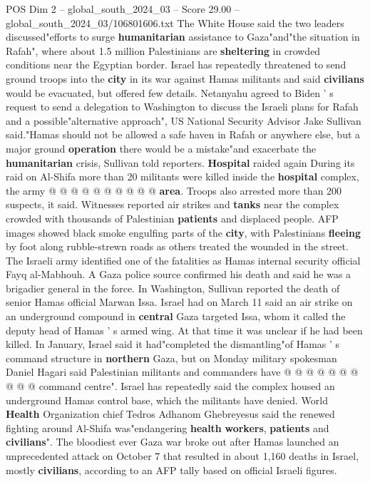 \begin{textsample}{POS Dim 2 – global\_south\_2024\_03 – Score 29.00 – global\_south\_2024\_03/106801606.txt}
The White House said the two leaders discussed"efforts to surge \textbf{humanitarian} assistance to Gaza"and"the situation in Rafah", where about 1.5 million Palestinians are \textbf{sheltering} in crowded conditions near the Egyptian border.
Israel has repeatedly threatened to send ground troops into the \textbf{city} in its war against Hamas militants and said \textbf{civilians} would be evacuated, but offered few details.
Netanyahu agreed to Biden ' s request to send a delegation to Washington to discuss the Israeli plans for Rafah and a possible"alternative approach", US National Security Advisor Jake Sullivan said."Hamas should not be allowed a safe haven in Rafah or anywhere else, but a major ground \textbf{operation} there would be a mistake"and exacerbate the \textbf{humanitarian} crisis, Sullivan told reporters. \textbf{Hospital} raided again During its raid on Al-Shifa more than 20 militants were killed inside the \textbf{hospital} complex, the army @ @ @ @ @ @ @ @ @ @ \textbf{area}.
Troops also arrested more than 200 suspects, it said.
Witnesses reported air strikes and \textbf{tanks} near the complex crowded with thousands of Palestinian \textbf{patients} and displaced people.
AFP images showed black smoke engulfing parts of the \textbf{city}, with Palestinians \textbf{fleeing} by foot along rubble-strewn roads as others treated the wounded in the street.
The Israeli army identified one of the fatalities as Hamas internal security official Fayq al-Mabhouh.
A Gaza police source confirmed his death and said he was a brigadier general in the force.
In Washington, Sullivan reported the death of senior Hamas official Marwan Issa.
Israel had on March 11 said an air strike on an underground compound in \textbf{central} Gaza targeted Issa, whom it called the deputy head of Hamas ' s armed wing.
At that time it was unclear if he had been killed.
In January, Israel said it had"completed the dismantling"of Hamas ' s command structure in \textbf{northern} Gaza, but on Monday military spokesman Daniel Hagari said Palestinian militants and commanders have @ @ @ @ @ @ @ @ @ @ command centre".
Israel has repeatedly said the complex housed an underground Hamas control base, which the militants have denied.
World \textbf{Health} Organization chief Tedros Adhanom Ghebreyesus said the renewed fighting around Al-Shifa was"endangering \textbf{health} \textbf{workers}, \textbf{patients} and \textbf{civilians}".
The bloodiest ever Gaza war broke out after Hamas launched an unprecedented attack on October 7 that resulted in about 1,160 deaths in Israel, mostly \textbf{civilians}, according to an AFP tally based on official Israeli figures.

\end{textsample}
